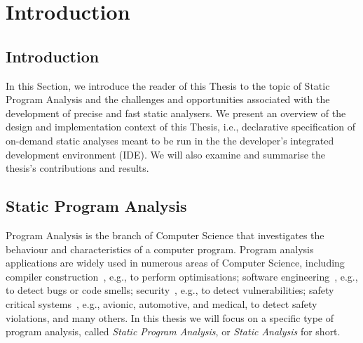 \chapter{Introduction}
\section{Introduction}
In this Section, we  introduce the reader of this Thesis to the topic of Static Program Analysis and
the challenges and opportunities associated with the development of precise and fast static analysers.
We present an overview of the design and implementation context of this Thesis, i.e., 
declarative specification of on-demand static analyses meant to be run in the the developer's 
integrated development environment (IDE).
We will also examine and summarise the thesis's contributions and results.



\section{Static Program Analysis}

Program Analysis is the branch of Computer Science that investigates the behaviour
and characteristics of a computer program. Program analysis applications are widely
used in numerous areas of Computer Science, including compiler construction~\cite{aho2007compilers,appel2004modern},
e.g., to perform optimisations; software engineering~\cite{ayewah2008using,dura2021javadl,fink2012wala}, e.g., to detect bugs or
code smells; security~\cite{piskachev2021secucheck,flowDroid}, e.g., to detect vulnerabilities; safety
critical systems~\cite{cousot2005astree,Blanchet2002}, e.g., avionic, automotive, and medical, to detect safety
violations, and many others. In this thesis we will focus on a specific type of program analysis, called
\emph{Static Program Analysis}, or \emph{Static Analysis} for short.


